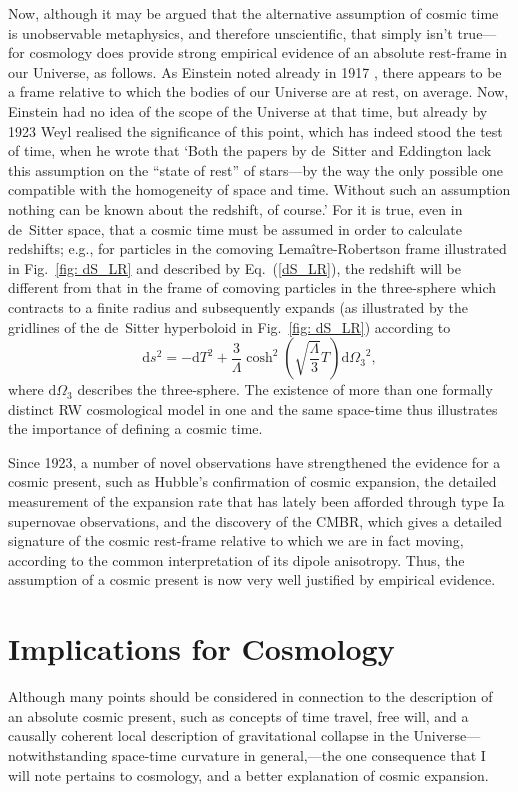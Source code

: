 \documentclass[11pt]{article}
\begin{document}
Now, although it may be argued that the alternative assumption of cosmic time is unobservable metaphysics, and therefore unscientific, that simply isn't true---for cosmology does provide strong empirical evidence of an absolute rest-frame in our Universe, as follows. As Einstein noted already in 1917 \cite{Einstein1917}, there appears to be a frame relative to which the bodies of our Universe are at rest, on average. Now, Einstein had no idea of the scope of the Universe at that time, but already by 1923 Weyl realised the significance of this point, which has indeed stood the test of time, when he wrote that \cite{Weyl1923} `Both the papers by de~Sitter \cite{deSitter1917} and Eddington \cite{Eddington1923} lack this assumption on the ``state of rest'' of stars---by the way the only possible one compatible with the homogeneity of space and time. Without such an assumption nothing can be known about the redshift, of course.' For it is true, even in de~Sitter space, that a cosmic time must be assumed in order to calculate redshifts; e.g., for particles in the comoving Lema\^{i}tre-Robertson frame illustrated in Fig.~\ref{fig: dS_LR} and described by Eq.~(\ref{dS_LR}), the redshift will be different from that in the frame of comoving particles in the three-sphere which contracts to a finite radius and subsequently expands (as illustrated by the gridlines of the de~Sitter hyperboloid in Fig.~\ref{fig: dS_LR}) according to
\begin{equation}
\mathrm{d}s^2=-\mathrm{d}T^2+\frac{3}{\Lambda}\cosh^2\left(\sqrt{\frac{\Lambda}{3}}T\right){\mathrm{d}\Omega_3}^2,\label{dS_comoving_univ}
\end{equation} 
where ${\mathrm{d}\Omega_3}$ describes the three-sphere. The existence of more than one formally distinct RW cosmological model in one and the same space-time thus illustrates the importance of defining a cosmic time.

Since 1923, a number of novel observations have strengthened the evidence for a cosmic present, such as Hubble's confirmation of cosmic expansion, the detailed measurement of the expansion rate that has lately been afforded through type Ia supernovae observations, and the discovery of the CMBR, which gives a detailed signature of the cosmic rest-frame relative to which we are in fact moving, according to the common interpretation of its dipole anisotropy. Thus, the assumption of a cosmic present is now very well justified by empirical evidence.

\section{Implications for Cosmology \label{sec_IfC}}
Although many points should be considered in connection to the description of an absolute cosmic present, such as concepts of time travel, free will, and a causally coherent local description of gravitational collapse in the Universe---notwithstanding space-time curvature in general,---the one consequence that I will note pertains to cosmology, and a better explanation of cosmic expansion.
\end{document}
